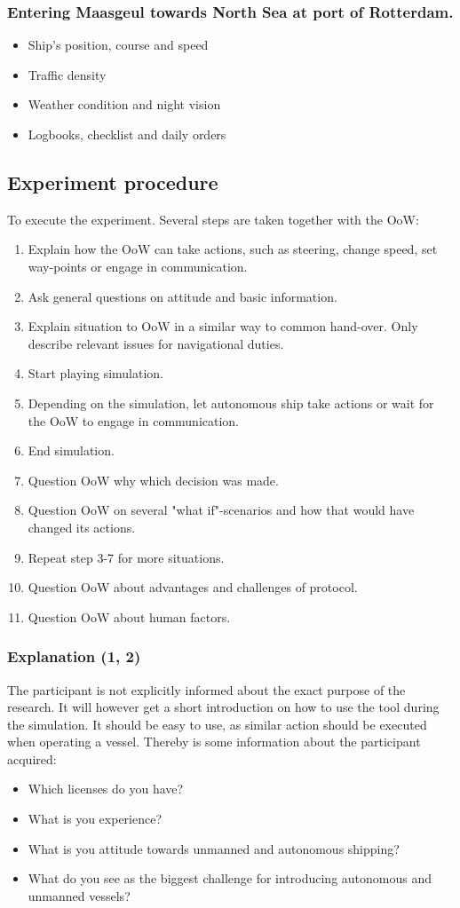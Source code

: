 \subsubsection{Entering Maasgeul towards North Sea at port of Rotterdam.}
\begin{itemize}
	\item Ship's position, course and speed
	\item Traffic density
	\item Weather condition and night vision
	\item Logbooks, checklist and daily orders
\end{itemize}

\subsection{Experiment procedure}
To execute the experiment. Several steps are taken together with the \acf{OoW}:
\begin{enumerate}
	\item Explain how the OoW can take actions, such as steering, change speed, set way-points or engage in communication.
	\item Ask general questions on attitude and basic information.
	\item Explain situation to OoW in a similar way to common hand-over. Only describe relevant issues for navigational duties.
	\item Start playing simulation.
	\item Depending on the simulation, let autonomous ship take actions or wait for the OoW to engage in communication.
	\item End simulation.
	\item Question OoW why which decision was made.
	\item Question OoW on several "what if"-scenarios and how that would have changed its actions.
	\item Repeat step 3-7 for more situations.
	\item Question OoW about advantages and challenges of protocol.
	\item Question OoW about human factors.
\end{enumerate}

\subsubsection{Explanation (1, 2)}
The participant is not explicitly informed about the exact purpose of the research. It will however get a short introduction on how to use the tool during the simulation. It should be easy to use, as similar action should be executed when operating a vessel. Thereby is some information about the participant acquired:
\begin{itemize}
	\item Which licenses do you have?
	\item What is you experience?
	\item What is you attitude towards unmanned and autonomous shipping?
	\item What do you see as the biggest challenge for introducing autonomous and unmanned vessels?
\end{itemize}

